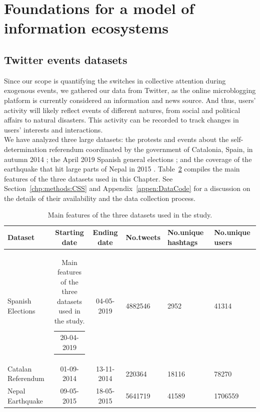 \section{Foundations for a model of information ecosystems}
\label{chp3:1}

\subsection{Twitter events datasets}
\label{chp3:1.1}

Since our scope is quantifying the switches in collective attention during exogenous events, we gathered  our data from Twitter, as the online microblogging platform is currently considered  an information and news source. And thus, users' activity will likely reflect events of different natures, from social and political affairs to natural disasters. This activity  can be recorded to track changes in users' interests and interactions. \\

We have analyzed three large datasets: the protests and events about the self-determination referendum coordinated by the government of Catalonia, Spain, in autumn 2014 \cite{palazzi2021ecological};  the April 2019 Spanish general elections \cite{palazzi2021ecological}; and the coverage of the earthquake that hit large parts of Nepal in 2015 \cite{zubiaga2018}. Table~\ref{chp3:tab:datasets} compiles the main features of the three datasets used in this Chapter. See Section~\ref{chp:methods:CSS} and Appendix~\ref{appen:DataCode} for a discussion on the details of their availability and the data collection process.  \\

\begin{table}
\caption[Main features of the three datasets]{\label{chp3:tab:datasets} Main features of the three datasets used in the study.}
\footnotesize
\begin{tabularx}{1\textwidth}{@{} X c c X X X}
\hline
Dataset&Starting date&Ending date & No.tweets & No.unique hashtags & No.unique users\\
\hline
\hline
Spanish Elections & \begin{tabular}{c}  20-04-2019  \end{tabular} & 04-05-2019 & 4882546 & 2952 & 41314 \\
\hline
Catalan Referendum & 01-09-2014 & 13-11-2014 & 220364 & 18116 & 78270 \\
\hline
Nepal Earthquake & 09-05-2015 & 18-05-2015 & 5641719 & 41589 &  1706559\\
\hline
\end{tabularx}\\
\end{table}

